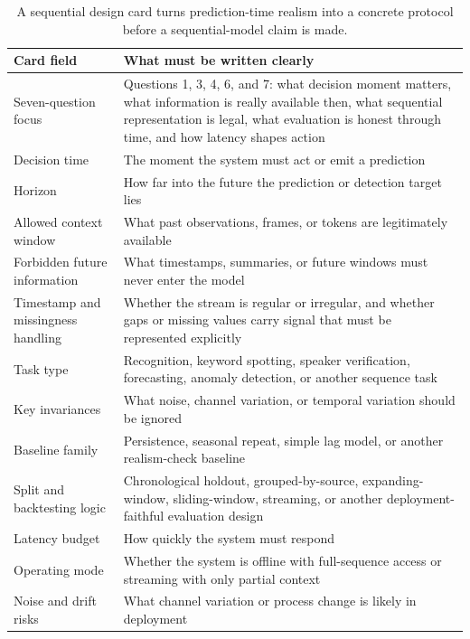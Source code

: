 \begin{table}[t]
\centering
\small
\setlength{\tabcolsep}{4pt}
\begin{tabular}{L{3.25cm}L{6.98cm}}
\toprule
Card field & What must be written clearly \\
\midrule
Seven-question focus & Questions 1, 3, 4, 6, and 7: what decision moment matters, what information is really available then, what sequential representation is legal, what evaluation is honest through time, and how latency shapes action \\
Decision time & The moment the system must act or emit a prediction \\
Horizon & How far into the future the prediction or detection target lies \\
Allowed context window & What past observations, frames, or tokens are legitimately available \\
Forbidden future information & What timestamps, summaries, or future windows must never enter the model \\
Timestamp and missingness handling & Whether the stream is regular or irregular, and whether gaps or missing values carry signal that must be represented explicitly \\
Task type & Recognition, keyword spotting, speaker verification, forecasting, anomaly detection, or another sequence task \\
Key invariances & What noise, channel variation, or temporal variation should be ignored \\
Baseline family & Persistence, seasonal repeat, simple lag model, or another realism-check baseline \\
Split and backtesting logic & Chronological holdout, grouped-by-source, expanding-window, sliding-window, streaming, or another deployment-faithful evaluation design \\
Latency budget & How quickly the system must respond \\
Operating mode & Whether the system is offline with full-sequence access or streaming with only partial context \\
Noise and drift risks & What channel variation or process change is likely in deployment \\
\bottomrule
\end{tabular}
\caption{A sequential design card turns prediction-time realism into a concrete protocol before a sequential-model claim is made.}
\label{tab:sequential-design-card}
\end{table}

